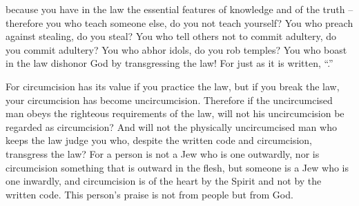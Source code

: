 {because you have
in
the law
the essential features
of knowledge
and
of the truth –
therefore
you who teach
someone else,
do you
not
teach
yourself? You who preach
against
stealing,
do you steal?
You who tell
others not
to commit adultery,
do you commit adultery? You who abhor
idols,
do you rob temples?
You
who
boast
in
the law
dishonor
God
by
transgressing
the law!
For
just as
it is written, “{}.”
\par }{\PP {}For
circumcision
has
its value
if
you practice
the law,
but
if
you
break
the law,
your
circumcision
has become
uncircumcision.
Therefore
if
the uncircumcised man
obeys
the righteous requirements
of the law,
will
not
his
uncircumcision
be regarded
as
circumcision?
And
will not the physically
uncircumcised man
who keeps
the law
judge
you
who, despite the written code
and
circumcision,
transgress
the law?
For
a person is
not
a Jew
who is one outwardly,
nor
is circumcision
something that is outward
in
the flesh,
but
someone is a Jew
who is one inwardly,
and
circumcision
is of the heart
by
the Spirit
and
not
by the written code.
This person’s praise
is not
from
people
but
from
God.


}
